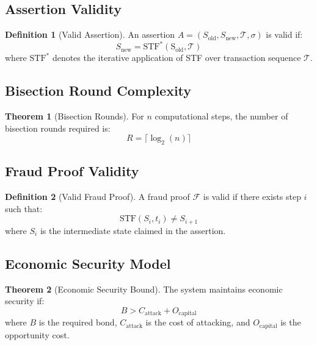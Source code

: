 \documentclass[11pt,a4paper]{article}
\theoremstyle{definition}
\newtheorem{definition}{Definition}[section]
\newtheorem{theorem}{Theorem}[section]
\begin{document}
\subsection{Assertion Validity}

\begin{definition}[Valid Assertion]
An assertion $A = (S_{\text{old}}, S_{\text{new}}, \mathcal{T}, \sigma)$ is valid if:
\begin{equation}
S_{\text{new}} = \text{STF}^*(\text{S}_{\text{old}}, \mathcal{T})
\end{equation}
where $\text{STF}^*$ denotes the iterative application of STF over transaction sequence $\mathcal{T}$.
\end{definition}

\subsection{Bisection Round Complexity}

\begin{theorem}[Bisection Rounds]
For $n$ computational steps, the number of bisection rounds required is:
\begin{equation}
R = \lceil\log_2(n)\rceil
\end{equation}
\end{theorem}

\subsection{Fraud Proof Validity}

\begin{definition}[Valid Fraud Proof]
A fraud proof $\mathcal{F}$ is valid if there exists step $i$ such that:
\begin{equation}
\text{STF}(S_i, t_i) \neq S_{i+1}
\end{equation}
where $S_i$ is the intermediate state claimed in the assertion.
\end{definition}

\subsection{Economic Security Model}

\begin{theorem}[Economic Security Bound]
The system maintains economic security if:
\begin{equation}
B > C_{\text{attack}} + O_{\text{capital}}
\end{equation}
where $B$ is the required bond, $C_{\text{attack}}$ is the cost of attacking, and $O_{\text{capital}}$ is the opportunity cost.
\end{theorem}
\end{document}
